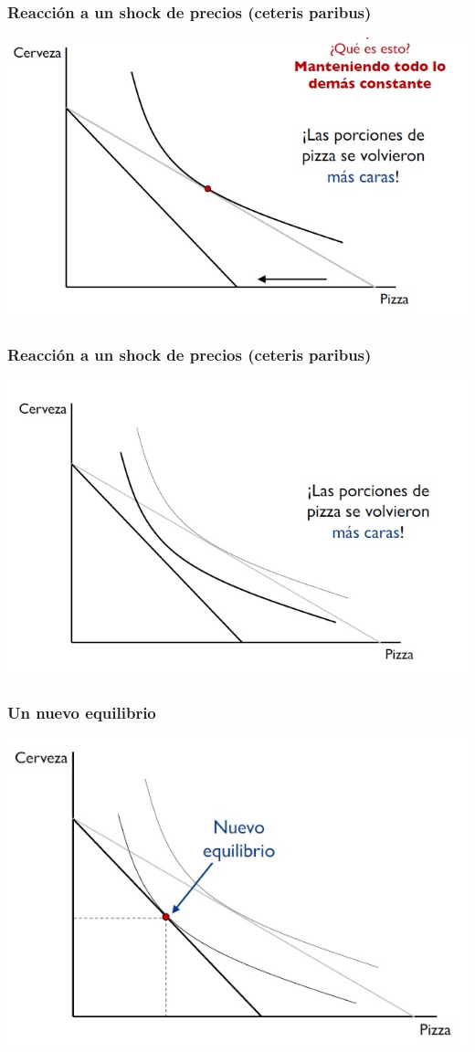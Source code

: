 \documentclass{beamer}
\begin{document}
\begin{frame}
\frametitle{ Reacción a un shock de precios (ceteris paribus)}
\centering
\includegraphics[scale=0.65]{Figures/Tema_02.20_rp18.jpg}
\end{frame}

\begin{frame}
\frametitle{ Reacción a un shock de precios (ceteris paribus)}
\centering
\includegraphics[scale=0.65]{Figures/Tema_02.21_rp19.jpg}
\end{frame}

\begin{frame}
\frametitle{Un nuevo equilibrio}
\centering
\includegraphics[scale=0.65]{Figures/Tema_02.22_rp20.jpg}
\end{frame}
\end{document}
